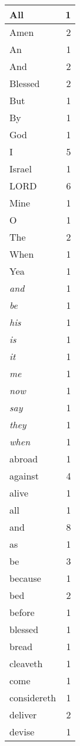 \begin{center}
\begin{longtable}{l|r}
\hline \hline
\endlastfoot
All & 1 \\ \hline
Amen & 2 \\ \hline
An & 1 \\ \hline
And & 2 \\ \hline
Blessed & 2 \\ \hline
But & 1 \\ \hline
By & 1 \\ \hline
God & 1 \\ \hline
I & 5 \\ \hline
Israel & 1 \\ \hline
LORD & 6 \\ \hline
Mine & 1 \\ \hline
O & 1 \\ \hline
The & 2 \\ \hline
When & 1 \\ \hline
Yea & 1 \\ \hline
\emph{and} & 1 \\ \hline
\emph{be} & 1 \\ \hline
\emph{his} & 1 \\ \hline
\emph{is} & 1 \\ \hline
\emph{it} & 1 \\ \hline
\emph{me} & 1 \\ \hline
\emph{now} & 1 \\ \hline
\emph{say} & 1 \\ \hline
\emph{they} & 1 \\ \hline
\emph{when} & 1 \\ \hline
abroad & 1 \\ \hline
against & 4 \\ \hline
alive & 1 \\ \hline
all & 1 \\ \hline
and & 8 \\ \hline
as & 1 \\ \hline
be & 3 \\ \hline
because & 1 \\ \hline
bed & 2 \\ \hline
before & 1 \\ \hline
blessed & 1 \\ \hline
bread & 1 \\ \hline
cleaveth & 1 \\ \hline
come & 1 \\ \hline
considereth & 1 \\ \hline
deliver & 2 \\ \hline
devise & 1 \\ \hline

\end{longtable}
\end{center}
